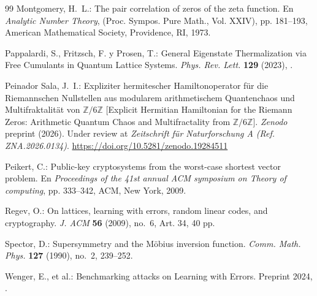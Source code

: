 \documentclass{article}
\numberwithin{equation}{section}
\theoremstyle{plain}
\theoremstyle{definition}
\begin{document}
\begin{thebibliography}{99}
Montgomery, H.~L.: 
The pair correlation of zeros of the zeta function.
En \emph{Analytic Number Theory}, (Proc. Sympos. Pure Math., Vol. XXIV), 
pp. 181--193, American Mathematical Society, Providence, RI, 1973.

Pappalardi, S., Fritzsch, F. y Prosen, T.:
General Eigenstate Thermalization via Free Cumulants in Quantum Lattice Systems.
\emph{Phys. Rev. Lett.} \textbf{129} (2023), .

Peinador Sala, J.~I.: 
Expliziter hermitescher Hamiltonoperator für die Riemannschen Nullstellen aus modularem arithmetischem Quantenchaos und Multifraktalität von $\mathbb{Z}/6\mathbb{Z}$ [Explicit Hermitian Hamiltonian for the Riemann Zeros: Arithmetic Quantum Chaos and Multifractality from $\mathbb{Z}/6\mathbb{Z}$]. 
\emph{Zenodo} preprint (2026). Under review at \emph{Zeitschrift für Naturforschung A (Ref. ZNA.2026.0134)}. \url{https://doi.org/10.5281/zenodo.19284511}

Peikert, C.: 
Public-key cryptosystems from the worst-case shortest vector problem.
En \emph{Proceedings of the 41st annual ACM symposium on Theory of computing}, 
pp. 333--342, ACM, New York, 2009.

Regev, O.: 
On lattices, learning with errors, random linear codes, and cryptography.
\emph{J. ACM} \textbf{56} (2009), no.~6, Art. 34, 40 pp.

Spector, D.: 
Supersymmetry and the M\"{o}bius inversion function. 
\emph{Comm. Math. Phys.} \textbf{127} (1990), no.~2, 239--252.

Wenger, E., et al.: 
Benchmarking attacks on Learning with Errors. 
Preprint 2024, .

\end{thebibliography}
\end{document}
